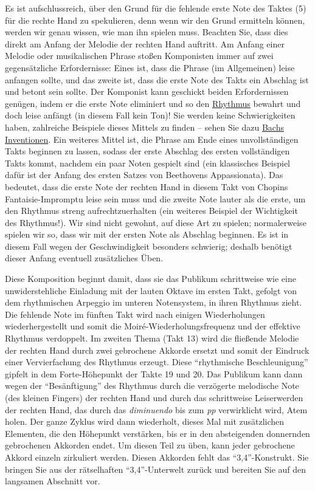 Es ist aufschlussreich, über den Grund für die fehlende erste Note des Taktes (5) für die rechte Hand zu spekulieren, denn wenn wir den Grund ermitteln können, werden wir genau wissen, wie man ihn spielen muss.
Beachten Sie, dass dies direkt am Anfang der Melodie der rechten Hand auftritt.
Am Anfang einer Melodie oder musikalischen Phrase stoßen Komponisten immer auf zwei gegensätzliche Erfordernisse: Eines ist, dass die Phrase (im Allgemeinen) leise anfangen sollte, und das zweite ist, dass die erste Note des Takts ein Abschlag ist und betont sein sollte.
Der Komponist kann geschickt beiden Erfordernissen genügen, indem er die erste Note eliminiert und so den \hyperref[c1iii1b]{Rhythmus} bewahrt und doch leise anfängt (in diesem Fall kein Ton)!
Sie werden keine Schwierigkeiten haben, zahlreiche Beispiele dieses Mittels zu finden -- sehen Sie dazu \hyperref[c1iii20]{Bachs Inventionen}.
Ein weiteres Mittel ist, die Phrase am Ende eines unvollständigen Takts beginnen zu lassen, sodass der erste Abschlag des ersten vollständigen Takts kommt, nachdem ein paar Noten gespielt sind (ein klassisches Beispiel dafür ist der Anfang des ersten Satzes von Beethovens Appassionata).
Das bedeutet, dass die erste Note der rechten Hand in diesem Takt von Chopins Fantaisie-Impromptu leise sein muss und die zweite Note lauter als die erste, um den Rhythmus streng aufrechtzuerhalten (ein weiteres Beispiel der Wichtigkeit des Rhythmus!).
Wir sind nicht gewohnt, auf diese Art zu spielen; normalerweise spielen wir so, dass wir mit der ersten Note als Abschlag beginnen.
Es ist in diesem Fall wegen der Geschwindigkeit besonders schwierig; deshalb benötigt dieser Anfang eventuell zusätzliches Üben.

Diese Komposition beginnt damit, dass sie das Publikum schrittweise wie eine unwiderstehliche Einladung mit der lauten Oktave im ersten Takt, gefolgt von dem rhythmischen Arpeggio im unteren Notensystem, in ihren Rhythmus zieht.
Die fehlende Note im fünften Takt wird nach einigen Wiederholungen wiederhergestellt und somit die Moiré-Wiederholungsfrequenz und der effektive Rhythmus verdoppelt.
Im zweiten Thema (Takt 13) wird die fließende Melodie der rechten Hand durch zwei gebrochene Akkorde ersetzt und somit der Eindruck einer Vervierfachung des Rhythmus erzeugt.
Diese \enquote{rhythmische Beschleunigung} gipfelt in dem Forte-Höhepunkt der Takte 19 und 20.
Das Publikum kann dann wegen der \enquote{Besänftigung} des Rhythmus durch die verzögerte melodische Note (des kleinen Fingers) der rechten Hand und durch das schrittweise Leiserwerden der rechten Hand, das durch das \textit{diminuendo} bis zum \textit{pp} verwirklicht wird, Atem holen.
Der ganze Zyklus wird dann wiederholt, dieses Mal mit zusätzlichen Elementen, die den Höhepunkt verstärken, bis er in den absteigenden donnernden gebrochenen Akkorden endet.
Um diesen Teil zu üben, kann jeder gebrochene Akkord einzeln zirkuliert werden.
Diesen Akkorden fehlt das \enquote{3,4}-Konstrukt. Sie bringen Sie aus der rätselhaften \enquote{3,4}-Unterwelt zurück und bereiten Sie auf den langsamen Abschnitt vor.


